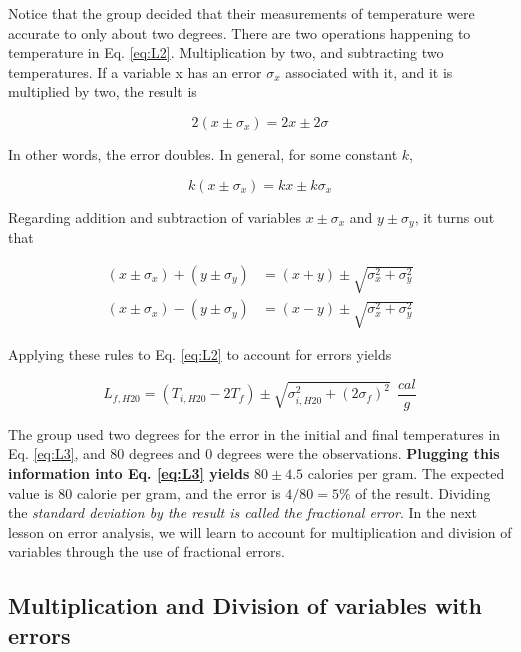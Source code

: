 \documentclass[12pt]{article}
\begin{document}
Notice that the group decided that their measurements of temperature were accurate to only about two degrees.  There are two operations happening to temperature in Eq. \ref{eq:L2}.  Multiplication by two, and subtracting two temperatures.  If a variable x has an error $\sigma_x$ associated with it, and it is multiplied by two, the result is

\begin{equation}
2(x\pm \sigma_x) = 2x \pm 2\sigma
\end{equation}

In other words, the error doubles.  In general, for some constant $k$,

\begin{equation}
k(x\pm \sigma_x) = kx \pm k\sigma_x
\end{equation}

Regarding addition and subtraction of variables $x\pm \sigma_x$ and $y\pm \sigma_y$, it turns out that

\begin{align}
(x\pm \sigma_x) + (y\pm \sigma_y) &= (x+y) \pm \sqrt{\sigma_x^2 + \sigma_y^2} \\
(x\pm \sigma_x) - (y\pm \sigma_y) &= (x-y) \pm \sqrt{\sigma_x^2 + \sigma_y^2}
\end{align}

Applying these rules to Eq. \ref{eq:L2} to account for errors yields

\begin{equation}
L_{f,H20} = \left( T_{i,H20} - 2T_f\right) \pm \sqrt{\sigma_{i,H20}^2 + (2\sigma_f)^2}~~\frac{cal}{g} \label{eq:L3}
\end{equation}

The group used two degrees for the error in the initial and final temperatures in Eq. \ref{eq:L3}, and 80 degrees and 0 degrees were the observations.  \textbf{Plugging this information into Eq. \ref{eq:L3} yields} $80 \pm 4.5$ calories per gram.  The expected value is 80 calorie per gram, and the error is $4/80 = 5\%$ of the result.  Dividing the \textit{standard deviation by the result is called the fractional error}.  In the next lesson on error analysis, we will learn to account for multiplication and division of variables through the use of fractional errors.

\subsection{Multiplication and Division of variables with errors}
\end{document}
